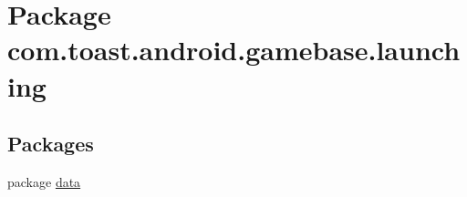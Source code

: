 \hypertarget{namespacecom_1_1toast_1_1android_1_1gamebase_1_1launching}{}\section{Package com.\+toast.\+android.\+gamebase.\+launching}
\label{namespacecom_1_1toast_1_1android_1_1gamebase_1_1launching}
\subsection*{Packages}
\begin{DoxyCompactItemize}
\item 
package \hyperlink{namespacecom_1_1toast_1_1android_1_1gamebase_1_1launching_1_1data}{data}
\end{DoxyCompactItemize}
